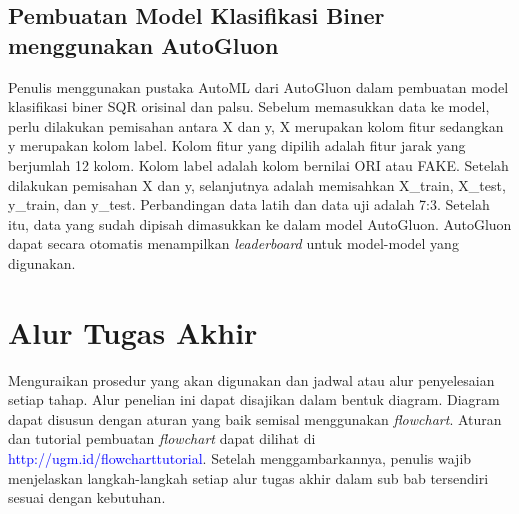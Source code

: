 \subsection{Pembuatan Model Klasifikasi Biner menggunakan AutoGluon}
Penulis menggunakan pustaka AutoML dari AutoGluon dalam pembuatan model klasifikasi biner SQR orisinal dan palsu. Sebelum memasukkan data ke model, perlu dilakukan pemisahan antara X dan y, X merupakan kolom fitur sedangkan y merupakan kolom label. Kolom fitur yang dipilih adalah fitur jarak yang berjumlah 12 kolom. Kolom label adalah kolom bernilai ORI atau FAKE. Setelah dilakukan pemisahan X dan y, selanjutnya adalah memisahkan X\_train, X\_test, y\_train, dan y\_test. Perbandingan data latih dan data uji adalah 7:3. Setelah itu, data yang sudah dipisah dimasukkan ke dalam model AutoGluon. AutoGluon dapat secara otomatis menampilkan \emph{leaderboard} untuk model-model yang digunakan.

\section{Alur Tugas Akhir}

Menguraikan prosedur yang akan digunakan dan jadwal atau alur penyelesaian setiap tahap. Alur penelian ini dapat disajikan dalam bentuk diagram. Diagram dapat
disusun dengan aturan yang baik semisal menggunakan \textit{flowchart}. Aturan dan tutorial pembuatan \textit{flowchart} dapat dilihat di
\textcolor{blue}{http://ugm.id/flowcharttutorial}. Setelah menggambarkannya, penulis wajib menjelaskan langkah-langkah setiap alur tugas akhir dalam sub bab
tersendiri sesuai dengan kebutuhan.